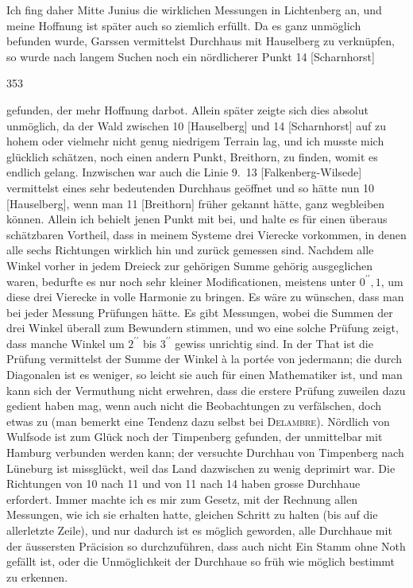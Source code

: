 Ich fing daher Mitte Junius die wirklichen Messungen in Lichtenberg an, und meine Hoffnung ist später auch so ziemlich erfüllt.
Da es ganz unmöglich befunden wurde, Garssen vermittelst Durchhaus mit Hauselberg zu verknüpfen, so wurde nach langem Suchen noch ein nördlicherer Punkt 14 [Scharnhorst]
\par\clearpage
{}\hfill353\par\medskip
\noindent gefunden, der mehr Hoffnung darbot.
Allein später zeigte sich dies absolut unmöglich, da der Wald zwischen 10 [Hauselberg] und 14 [Scharnhorst] auf zu hohem oder vielmehr nicht genug niedrigem Terrain lag, und ich musste mich glücklich schätzen, noch einen andern Punkt, Breithorn, zu finden, womit es endlich gelang.
Inzwischen war auch die Linie 9.~13 [Falkenberg-Wilsede] vermittelst eines sehr bedeutenden Durchhaus geöffnet und so hätte nun 10 [Hauselberg], wenn man 11 [Breithorn] früher gekannt hätte, ganz wegbleiben können.
Allein ich behielt jenen Punkt mit bei, und halte es für einen überaus schätzbaren Vortheil, dass in meinem Systeme drei Vierecke vorkommen, in denen alle sechs Richtungen wirklich hin und zurück gemessen sind.
Nachdem alle Winkel vorher in jedem Dreieck zur gehörigen Summe gehörig ausgeglichen waren, bedurfte es nur noch sehr kleiner Modificationen, meistens unter \(0^{\prime\prime}{,}1\), um diese drei Vierecke in volle Harmonie zu bringen.
Es wäre zu wünschen, dass man bei jeder Messung  Prüfungen hätte.
Es gibt Messungen, wobei die Summen der drei Winkel überall zum Bewundern stimmen, und wo eine solche Prüfung zeigt, dass manche Winkel um \(2^{\prime\prime}\) bis \(3^{\prime\prime}\) gewiss unrichtig sind.
In der That ist die Prüfung vermittelst der Summe der Winkel à la portée von jedermann; die durch Diagonalen ist es weniger, so leicht sie auch für einen Mathematiker ist, und man kann sich der Vermuthung nicht erwehren, dass die erstere Prüfung zuweilen dazu gedient haben mag, wenn auch nicht die Beobachtungen zu verfälschen, doch etwas zu  (man bemerkt eine Tendenz dazu selbst bei \textsc{Delambre}).
Nördlich von Wulfsode ist zum Glück noch der Timpenberg gefunden, der unmittelbar mit Hamburg verbunden werden kann; der versuchte Durchhau von Timpenberg nach Lüneburg ist missglückt, weil das Land dazwischen zu wenig deprimirt war.
Die Richtungen von 10 nach 11 und von 11 nach 14 haben grosse Durchhaue erfordert.
Immer machte ich es mir zum Gesetz, mit der Rechnung allen Messungen, wie ich sie erhalten hatte, gleichen Schritt zu halten (bis auf die allerletzte Zeile), und nur dadurch ist es möglich geworden, alle Durchhaue mit der äussersten Präcision so durchzuführen, dass auch nicht Ein Stamm ohne Noth gefällt ist, oder die Unmöglichkeit der Durchhaue so früh wie möglich bestimmt zu erkennen.
